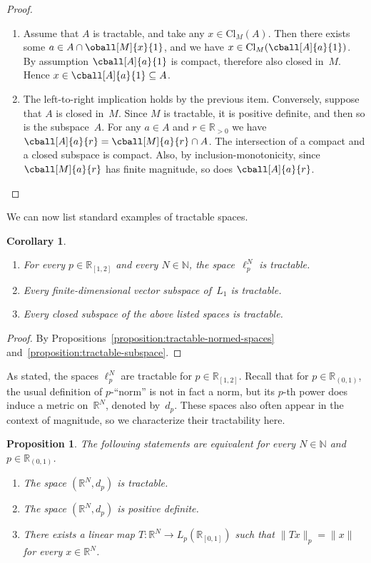 \documentclass[11pt]{article}
\theoremstyle{plain}
\newtheorem{proposition}[theorem]{Proposition}
\newtheorem{corollary}[theorem]{Corollary}
\theoremstyle{definition}
\newcommand{\NN}{\mathbb{N}}
\newcommand{\RR}{\mathbb{R}}
\newcommand{\intoo}[3][\RR]{{#1}_{(#2, #3)}}
\newcommand{\intcc}[3][\RR]{{#1}_{[#2, #3]}}
\newcommand{\cl}[1][]{\mathrm{Cl}_{#1}}
\begin{document}
\begin{proof}
\
\begin{enumerate}
\item
Assume that $A$ is tractable, and take any $x \in \cl[M](A)$. Then there exists some $a \in A \cap \oball[M]{x}{1}$, and we have $x \in \cl[M](\cball[A]{a}{1})$. By assumption $\cball[A]{a}{1}$ is compact, therefore also closed in~$M$. Hence $x \in \cball[A]{a}{1} \subseteq A$. 
\item
The left-to-right implication holds by the previous item. Conversely, suppose that $A$ is closed in~$M$. Since $M$ is tractable, it is positive definite, and then so is the subspace~$A$. For any $a \in A$ and $r \in \RR_{> 0}$ we have $\cball[A]{a}{r} = \cball[M]{a}{r} \cap A$. The intersection of a compact and a closed subspace is compact. Also, by inclusion-monotonicity, since $\cball[M]{a}{r}$ has finite magnitude, so does $\cball[A]{a}{r}$.
\end{enumerate}
\end{proof}

We can now list standard examples of tractable spaces.

\begin{corollary}\label{corollary:tractable-examples}
\
\begin{enumerate}
\item
For every $p \in \intcc{1}{2}$ and every $N \in \NN$, the space~$\ell_p^N$ is tractable.
\item
Every finite-dimensional vector subspace of~$L_1$ is tractable.
\item
Every closed subspace of the above listed spaces is tractable.
\end{enumerate}
\end{corollary}

\begin{proof}
By Propositions~\ref{proposition:tractable-normed-spaces} and~\ref{proposition:tractable-subspace}.
\end{proof}

As stated, the spaces $\ell_p^N$ are tractable for $p \in \intcc{1}{2}$. Recall that for $p \in \intoo{0}{1}$, the usual definition of $p$-``norm'' is not in fact a norm, but its $p$-th power does induce a metric on~$\RR^N$, denoted by~$d_p$. These spaces also often appear in the context of magnitude, so we characterize their tractability here.

\begin{proposition}
The following statements are equivalent for every $N \in \NN$ and $p \in \intoo{0}{1}$.
\begin{enumerate}
\item
The space $(\RR^N, d_p)$ is tractable.
\item
The space $(\RR^N, d_p)$ is positive definite.
\item
There exists a linear map $T\colon \RR^N \to L_p(\intcc{0}{1})$ such that $\|T x\|_p = \|x\|$ for every $x \in \RR^N$.
\end{enumerate}
\end{proposition}
\end{document}
